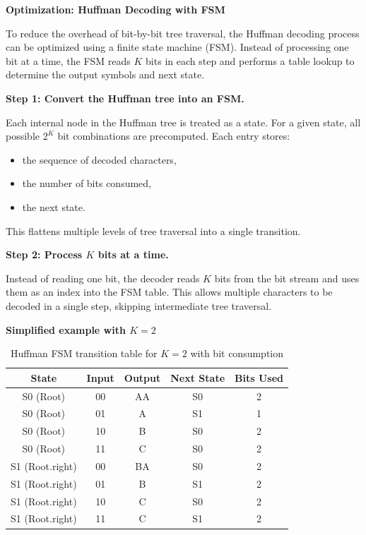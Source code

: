 \noindent \textbf{Optimization: Huffman Decoding with FSM}

\noindent To reduce the overhead of bit-by-bit tree traversal, the Huffman decoding process can be optimized using a finite state machine (FSM). Instead of processing one bit at a time, the FSM reads $K$ bits in each step and performs a table lookup to determine the output symbols and next state.

\medskip
\noindent \textbf{Step 1: Convert the Huffman tree into an FSM.}

\noindent Each internal node in the Huffman tree is treated as a state. For a given state, all possible $2^K$ bit combinations are precomputed. Each entry stores:
\begin{itemize}
    \item the sequence of decoded characters,
    \item the number of bits consumed,
    \item the next state.
\end{itemize}


\noindent This flattens multiple levels of tree traversal into a single transition.

\medskip
\noindent \textbf{Step 2: Process $K$ bits at a time.}

\vspace{0.3em}
\noindent Instead of reading one bit, the decoder reads $K$ bits from the bit stream and uses them as an index into the FSM table. This allows multiple characters to be decoded in a single step, skipping intermediate tree traversal.

\medskip
\noindent \textbf{Simplified example with $K=2$}

\begin{table}[H]
\centering
\begin{tabular}{c|c|c|c|c}
\textbf{State} & \textbf{Input} & \textbf{Output} & \textbf{Next State} & \textbf{Bits Used} \\
\hline
S0 (Root) & 00 & AA & S0 & 2 \\
S0 (Root) & 01 & A  & S1 & 1 \\
S0 (Root) & 10 & B  & S0 & 2 \\
S0 (Root) & 11 & C  & S0 & 2 \\
\hline
S1 (Root.right) & 00 & BA & S0 & 2 \\
S1 (Root.right) & 01 & B  & S1 & 2 \\
S1 (Root.right) & 10 & C  & S0 & 2 \\
S1 (Root.right) & 11 & C  & S1 & 2 \\
\end{tabular}
\caption{Huffman FSM transition table for $K=2$ with bit consumption}
\end{table}

